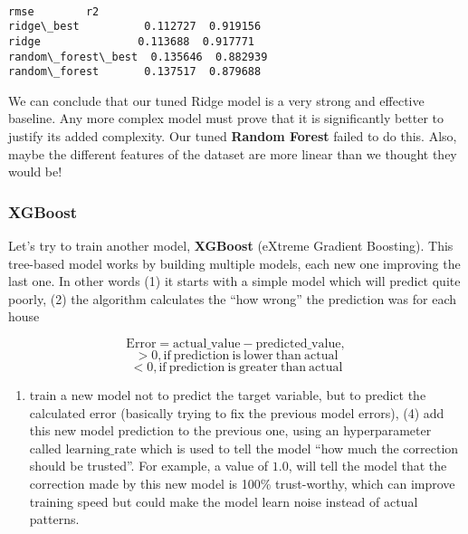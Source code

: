 \documentclass[11pt]{article}
\makeatletter
\providecommand{\tightlist}{%
      \setlength{\itemsep}{0pt}\setlength{\parskip}{0pt}}
\newcommand{\boxspacing}{\kern\kvtcb@left@rule\kern\kvtcb@boxsep}
\newcommand{\prompt}[4]{
        {\ttfamily\llap{{\color{#2}[#3]:\hspace{3pt}#4}}\vspace{-\baselineskip}}
    }
\makeatother
\begin{document}
    \begin{center}
    \end{center}
    { \hspace*{\fill} \\}
    
            \begin{tcolorbox}[breakable, size=fbox, boxrule=.5pt, pad at break*=1mm, opacityfill=0]
\prompt{Out}{outcolor}{30}{\boxspacing}
\begin{Verbatim}[commandchars=\\\{\}]
                        rmse        r2
ridge\_best          0.112727  0.919156
ridge               0.113688  0.917771
random\_forest\_best  0.135646  0.882939
random\_forest       0.137517  0.879688
\end{Verbatim}
\end{tcolorbox}
        
    We can conclude that our tuned Ridge model is a very strong and
effective baseline. Any more complex model must prove that it is
significantly better to justify its added complexity. Our tuned
\textbf{Random Forest} failed to do this. Also, maybe the different
features of the dataset are more linear than we thought they would be!

    \subsubsection{XGBoost}\label{xgboost}

    Let's try to train another model, \textbf{XGBoost} (eXtreme Gradient
Boosting). This tree-based model works by building multiple models, each
new one improving the last one. In other words (1) it starts with a
simple model which will predict quite poorly, (2) the algorithm
calculates the ``how wrong'' the prediction was for each house

\[\mathrm{Error}=\mathrm{actual\_value} - \mathrm{predicted\_value},\]
\[> 0, \mathrm{if\ prediction\ is\ lower\ than\ actual}\]
\[< 0, \mathrm{if\ prediction\ is\ greater\ than\ actual}\]

\begin{enumerate}
\def\labelenumi{(\arabic{enumi})}
\setcounter{enumi}{2}
\tightlist
\item
  train a new model not to predict the target variable, but to predict
  the calculated error (basically trying to fix the previous model
  errors), (4) add this new model prediction to the previous one, using
  an hyperparameter called \(\mathrm{learning\_rate}\) which is used to
  tell the model ``how much the correction should be trusted''. For
  example, a value of \(1.0\), will tell the model that the correction
  made by this new model is 100\% trust-worthy, which can improve
  training speed but could make the model learn noise instead of actual
  patterns.
\end{enumerate}
\end{document}
